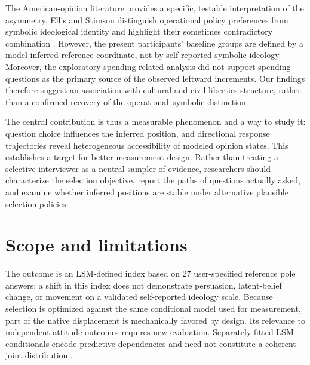 \documentclass[11pt]{article}
\begin{document}
The American-opinion literature provides a specific, testable interpretation of the asymmetry. Ellis and Stimson distinguish operational policy preferences from symbolic ideological identity and highlight their sometimes contradictory combination \citep{ellisStimson2012}. However, the present participants' baseline groups are defined by a model-inferred reference coordinate, not by self-reported symbolic ideology. Moreover, the exploratory spending-related analysis did not support spending questions as the primary source of the observed leftward increments. Our findings therefore suggest an association with cultural and civil-liberties structure, rather than a confirmed recovery of the operational--symbolic distinction.

The central contribution is thus a measurable phenomenon and a way to study it: question choice influences the inferred position, and directional response trajectories reveal heterogeneous accessibility of modeled opinion states. This establishes a target for better measurement design. Rather than treating a selective interviewer as a neutral sampler of evidence, researchers should characterize the selection objective, report the paths of questions actually asked, and examine whether inferred positions are stable under alternative plausible selection policies.

\section*{Scope and limitations}
The outcome is an LSM-defined index based on 27 user-specified reference pole answers; a shift in this index does not demonstrate persuasion, latent-belief change, or movement on a validated self-reported ideology scale. Because selection is optimized against the same conditional model used for measurement, part of the native displacement is mechanically favored by design. Its relevance to independent attitude outcomes requires new evaluation. Separately fitted LSM conditionals encode predictive dependencies and need not constitute a coherent joint distribution \citep{heckerman2000}.
\end{document}
